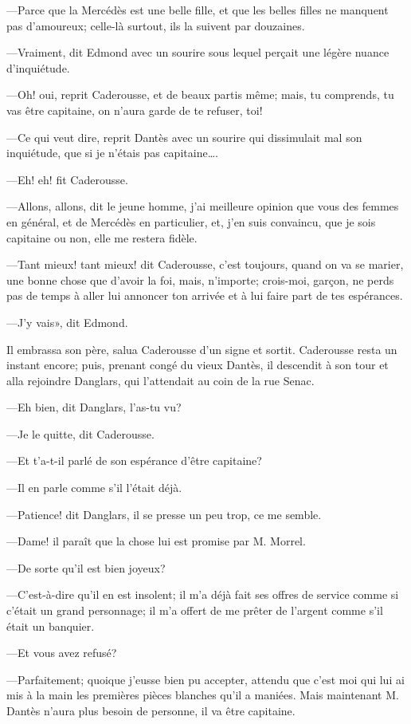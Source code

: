 —Parce que la Mercédès est une belle fille, et que les belles filles ne manquent pas d'amoureux; celle-là surtout, ils la suivent par douzaines.

—Vraiment, dit Edmond avec un sourire sous lequel perçait une légère nuance d'inquiétude.

—Oh! oui, reprit Caderousse, et de beaux partis même; mais, tu comprends, tu vas être capitaine, on n'aura garde de te refuser, toi!

—Ce qui veut dire, reprit Dantès avec un sourire qui dissimulait mal son inquiétude, que si je n'étais pas capitaine\dots.

—Eh! eh! fit Caderousse.

—Allons, allons, dit le jeune homme, j'ai meilleure opinion que vous des femmes en général, et de Mercédès en particulier, et, j'en suis convaincu, que je sois capitaine ou non, elle me restera fidèle.

—Tant mieux! tant mieux! dit Caderousse, c'est toujours, quand on va se marier, une bonne chose que d'avoir la foi, mais, n'importe; crois-moi, garçon, ne perds pas de temps à aller lui annoncer ton arrivée et à lui faire part de tes espérances.

—J'y vais», dit Edmond.

Il embrassa son père, salua Caderousse d'un signe et sortit. Caderousse resta un instant encore; puis, prenant congé du vieux Dantès, il descendit à son tour et alla rejoindre Danglars, qui l'attendait au coin de la rue Senac.

—Eh bien, dit Danglars, l'as-tu vu?

—Je le quitte, dit Caderousse.

—Et t'a-t-il parlé de son espérance d'être capitaine?

—Il en parle comme s'il l'était déjà.

—Patience! dit Danglars, il se presse un peu trop, ce me semble.

—Dame! il paraît que la chose lui est promise par M. Morrel.

—De sorte qu'il est bien joyeux?

—C'est-à-dire qu'il en est insolent; il m'a déjà fait ses offres de service comme si c'était un grand personnage; il m'a offert de me prêter de l'argent comme s'il était un banquier.

—Et vous avez refusé?

—Parfaitement; quoique j'eusse bien pu accepter, attendu que c'est moi qui lui ai mis à la main les premières pièces blanches qu'il a maniées. Mais maintenant M. Dantès n'aura plus besoin de personne, il va être capitaine.


